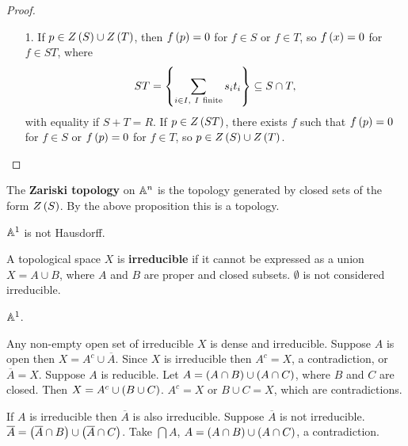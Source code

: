 \begin{proof}
\hfill
\begin{itemize}
\item[1.] If $ p \in Z\left( S \right) \cup Z\left( T \right) $, then $ f\left( p \right) = 0 $ for $ f \in S $ or $ f \in T $, so $ f\left( x \right) = 0 $ for $ f \in ST $, where
$$ ST = \cb{\sum_{i \in I, \ I \ \text{finite}} s_it_i} \subseteq S \cap T, $$
with equality if $ S + T = R $. If $ p \in Z\left( ST \right) $, there exists $ f $ such that $ f\left( p \right) = 0 $ for $ f \in S $ or $ f\left( p \right) = 0 $ for $ f \in T $, so $ p \in Z\left( S \right) \cup Z\left( T \right) $.
\end{itemize}
\end{proof}

\begin{definition}
The \textbf{Zariski topology} on $ \mathbb{A}^n $ is the topology generated by closed sets of the form $ Z\left( S \right) $. By the above proposition this is a topology.
\end{definition}

\begin{example}
$ \mathbb{A}^1 $ is not Hausdorff.
\end{example}

\begin{definition}
A topological space $ X $ is \textbf{irreducible} if it cannot be expressed as a union $ X = A \cup B $, where $ A $ and $ B $ are proper and closed subsets. $ \emptyset $ is not considered irreducible.
\end{definition}

\begin{example}
$ \mathbb{A}^1 $.
\end{example}

\begin{example}
Any non-empty open set of irreducible $ X $ is dense and irreducible. Suppose $ A $ is open then $ X = A^c \cup \overline{A} $. Since $ X $ is irreducible then $ A^c = X $, a contradiction, or $ \overline{A} = X $. Suppose $ A $ is reducible. Let $ A = \left( A \cap B \right) \cup \left( A \cap C \right) $, where $ B $ and $ C $ are closed. Then $ X = A^c \cup \left( B \cup C \right) $. $ A^c = X $ or $ B \cup C = X $, which are contradictions.
\end{example}

\begin{example}
If $ A $ is irreducible then $ \overline{A} $ is also irreducible. Suppose $ \overline{A} $ is not irreducible. $ \overline{A} = \left( \overline{A} \cap B \right) \cup \left( \overline{A} \cap C \right) $. Take $ \bigcap A $, $ A = \left( A \cap B \right) \cup \left( A \cap C \right) $, a contradiction.
\end{example}

